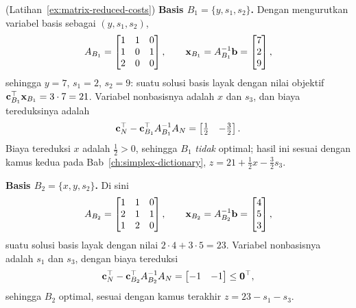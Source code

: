 \begin{solution}(Latihan~\ref{ex:matrix-reduced-costs})
\textbf{Basis \( B_1 = \{y, s_1, s_2\} \).}  Dengan mengurutkan variabel basis sebagai \( (y, s_1, s_2) \),
\[
A_{B_1} =
\begin{bmatrix}
1 & 1 & 0 \\
1 & 0 & 1 \\
2 & 0 & 0
\end{bmatrix},
\qquad
\mathbf{x}_{B_1} = A_{B_1}^{-1}\mathbf{b} = \begin{bmatrix} 7 \\ 2 \\ 9 \end{bmatrix},
\]
sehingga \( y = 7 \), \( s_1 = 2 \), \( s_2 = 9 \): suatu solusi basis layak dengan nilai objektif \( \mathbf{c}_{B_1}^\top \mathbf{x}_{B_1} = 3 \cdot 7 = 21 \).  Variabel nonbasisnya adalah \( x \) dan \( s_3 \), dan biaya tereduksinya adalah
\[
\mathbf{c}_N^\top - \mathbf{c}_{B_1}^\top A_{B_1}^{-1} A_N = \begin{bmatrix} \tfrac12 & -\tfrac32 \end{bmatrix}.
\]
Biaya tereduksi \( x \) adalah \( \tfrac12 > 0 \), sehingga \( B_1 \) \emph{tidak} optimal; hasil ini sesuai dengan kamus kedua pada Bab~\ref{ch:simplex-dictionary}, \( z = 21 + \tfrac12 x - \tfrac32 s_3 \).

\textbf{Basis \( B_2 = \{x, y, s_2\} \).}  Di sini
\[
A_{B_2} =
\begin{bmatrix}
1 & 1 & 0 \\
2 & 1 & 1 \\
1 & 2 & 0
\end{bmatrix},
\qquad
\mathbf{x}_{B_2} = A_{B_2}^{-1}\mathbf{b} = \begin{bmatrix} 4 \\ 5 \\ 3 \end{bmatrix},
\]
suatu solusi basis layak dengan nilai \( 2 \cdot 4 + 3 \cdot 5 = 23 \).  Variabel nonbasisnya adalah \( s_1 \) dan \( s_3 \), dengan biaya tereduksi
\[
\mathbf{c}_N^\top - \mathbf{c}_{B_2}^\top A_{B_2}^{-1} A_N = \begin{bmatrix} -1 & -1 \end{bmatrix} \leq \mathbf{0}^\top,
\]
sehingga \( B_2 \) optimal, sesuai dengan kamus terakhir \( z = 23 - s_1 - s_3 \).
\end{solution}

